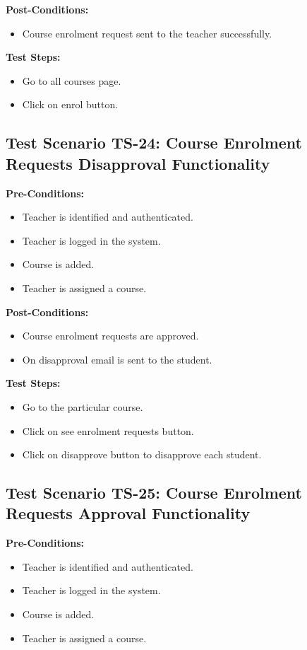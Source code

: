 \textbf{Post-Conditions: }
\begin{itemize}
\item Course enrolment request sent to the teacher successfully.

\end{itemize}
\textbf{Test Steps:}
\begin{itemize}

\item Go to all courses page.
\item Click on enrol button.

\end{itemize}



\subsection{Test Scenario TS-24: Course Enrolment Requests Disapproval Functionality}
\textbf{Pre-Conditions: }
\begin{itemize}

\item Teacher is identified and authenticated.
\item Teacher is logged in the system.
\item Course is added.
\item Teacher is assigned a course.

\end{itemize}

\textbf{Post-Conditions: }
\begin{itemize}
\item Course enrolment requests are approved.
\item On disapproval email is sent to the student.

\end{itemize}
\textbf{Test Steps:}
\begin{itemize}

\item Go to the particular course.
\item Click on see enrolment requests button.
\item Click on disapprove button to disapprove each student.

\end{itemize}



\subsection{Test Scenario TS-25: Course Enrolment Requests Approval Functionality}
\textbf{Pre-Conditions: }
\begin{itemize}

\item Teacher is identified and authenticated.
\item Teacher is logged in the system.
\item Course is added.
\item Teacher is assigned a course.

\end{itemize}

